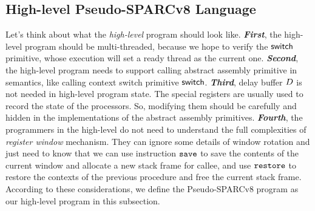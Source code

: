 \subsection{High-level Pseudo-SPARCv8 Language}
\label{subsec:High-level Pseudo-SPARCv8 Language}
Let's think about what the {\it high-level} program 
should look like. {\it \textbf{First}}, the high-level 
program should be multi-threaded, because we hope to 
verify the $\mathsf{switch}$ primitive, whose execution will 
set a ready thread as the current one. {\it \textbf{Second}}, 
the high-level program needs to support calling abstract 
assembly primitive in semantics, 
like calling context switch primitive $\mathsf{switch}$.  
{\it \textbf{Third}}, 
delay buffer $D$ is not needed in high-level program state.  
The special registers are usually used to record the state of 
the processors. So, modifying them should 
be carefully and hidden in the implementations of 
the abstract assembly primitives. {\it \textbf{Fourth}}, 
the programmers in the high-level do not need to understand 
the full complexities of {\it register window} 
mechanism. They can ignore some details of window rotation 
and just need to know that we can use 
instruction $\texttt{save}{}$ to save the contents of 
the current window and allocate a new stack frame for callee, 
and use $\texttt{restore}{}$ to restore the contexts 
of the previous procedure and free the current stack frame. 
According to these considerations, 
we define the Pseudo-SPARCv8 program as our 
high-level program in this subsection.  
